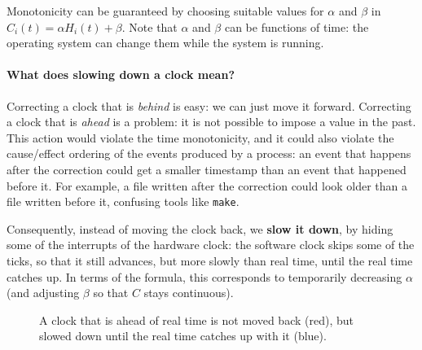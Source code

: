Monotonicity can be guaranteed by choosing suitable values for $\alpha$ and $\beta$ in $C_i(t) = \alpha H_i(t) + \beta$. Note that $\alpha$ and $\beta$ can be functions of time: the operating system can change them while the system is running.

\paragraph{What does slowing down a clock mean?} Correcting a clock that is \textit{behind} is easy: we can just move it forward. Correcting a clock that is \textit{ahead} is a problem: it is not possible to impose a value in the past. This action would violate the time monotonicity, and it could also violate the cause/effect ordering of the events produced by a process: an event that happens after the correction could get a smaller timestamp than an event that happened before it. For example, a file written after the correction could look older than a file written before it, confusing tools like \texttt{make}.

Consequently, instead of moving the clock back, we \textbf{slow it down}, by hiding some of the interrupts of the hardware clock: the software clock skips some of the ticks, so that it still advances, but more slowly than real time, until the real time catches up. In terms of the formula, this corresponds to temporarily decreasing $\alpha$ (and adjusting $\beta$ so that $C$ stays continuous).

\begin{figure}[H]
  \centering
  \caption{A clock that is ahead of real time is not moved back (red), but slowed down until the real time catches up with it (blue).}
  \label{fig:slow-down}
\end{figure}

